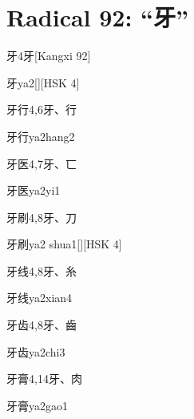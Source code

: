 
\section*{Radical 92: ``⽛''}

\begin{entry}{牙}{4}{⽛}[Kangxi 92]
  \begin{phonetics}{牙}{ya2}[][HSK 4]
  \end{phonetics}
\end{entry}

\begin{entry}{牙行}{4,6}{⽛、⾏}
  \begin{phonetics}{牙行}{ya2hang2}
  \end{phonetics}
\end{entry}

\begin{entry}{牙医}{4,7}{⽛、⼖}
  \begin{phonetics}{牙医}{ya2yi1}
  \end{phonetics}
\end{entry}

\begin{entry}{牙刷}{4,8}{⽛、⼑}
  \begin{phonetics}{牙刷}{ya2 shua1}[][HSK 4]
  \end{phonetics}
\end{entry}

\begin{entry}{牙线}{4,8}{⽛、⽷}
  \begin{phonetics}{牙线}{ya2xian4}
  \end{phonetics}
\end{entry}

\begin{entry}{牙齿}{4,8}{⽛、⿒}
  \begin{phonetics}{牙齿}{ya2chi3}
  \end{phonetics}
\end{entry}

\begin{entry}{牙膏}{4,14}{⽛、⾁}
  \begin{phonetics}{牙膏}{ya2gao1}
  \end{phonetics}
\end{entry}


